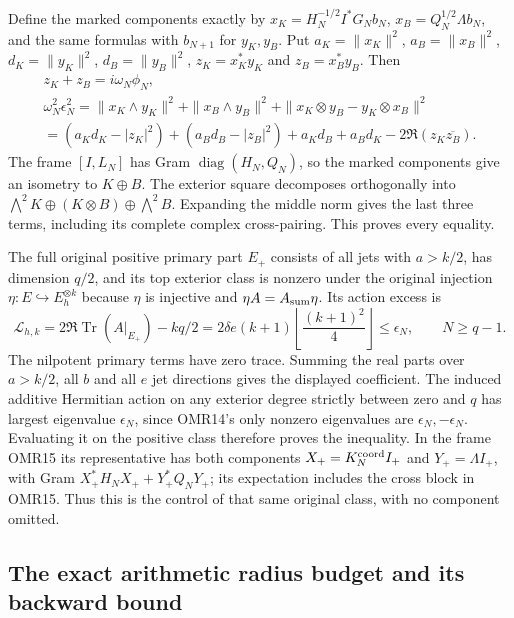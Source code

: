 \documentclass[11pt,a4paper]{article}
\begin{document}
Define the marked components exactly by
$x_K=H_N^{-1/2}I^*G_Nb_N$, $x_B=Q_N^{1/2}\Lambda b_N$,
and the same formulas with $b_{N+1}$ for $y_K,y_B$. Put
$a_K=\|x_K\|^2$, $a_B=\|x_B\|^2$,
$d_K=\|y_K\|^2$, $d_B=\|y_B\|^2$,
$z_K=x_K^*y_K$ and $z_B=x_B^*y_B$. Then
\[
 \begin{gathered}
 z_K+z_B=i\omega_N\phi_N,\\
 \omega_N^2\epsilon_N^2
 =\|x_K\wedge y_K\|^2+\|x_B\wedge y_B\|^2
          +\|x_K\otimes y_B-y_K\otimes x_B\|^2\\
 =(a_Kd_K-|z_K|^2)+(a_Bd_B-|z_B|^2)
       +a_Kd_B+a_Bd_K-2\Re(z_K\overline{z_B}).
 \end{gathered}\tag{OMR16}
\]
The frame $[I,L_N]$ has Gram $\operatorname{diag}(H_N,Q_N)$,
so the marked components give an isometry to $K\oplus B$.
The exterior square decomposes orthogonally into
$\bigwedge^2K\oplus(K\otimes B)\oplus\bigwedge^2B$.
Expanding the middle norm gives the last three terms, including
its complete complex cross-pairing. This proves every equality.

The full original positive primary part $E_+$ consists of all
jets with $a>k/2$, has dimension $q/2$, and its top exterior
class is nonzero under the original injection
$\eta:E\hookrightarrow E_h^{\otimes k}$ because $\eta$ is
injective and $\eta A=A_{\rm sum}\eta$. Its action excess is
\[
 \mathcal L_{h,k}=2\Re\operatorname{Tr}(A|_{E_+})-kq/2
     =2\delta e(k+1)\left\lfloor\frac{(k+1)^2}{4}\right\rfloor
     \le\epsilon_N,\qquad N\ge q-1.
 \tag{OMR17}
\]
The nilpotent primary terms have zero trace. Summing the real
parts over $a>k/2$, all $b$ and all $e$ jet directions gives the
displayed coefficient. The induced additive Hermitian action on
any exterior degree strictly between zero and $q$ has largest
eigenvalue $\epsilon_N$, since OMR14's only nonzero eigenvalues
are $\epsilon_N,-\epsilon_N$. Evaluating it on the positive
class therefore proves the inequality. In the frame OMR15 its
representative has both components
$X_+=K_N^{\rm coord}I_+$ and $Y_+=\Lambda I_+$, with Gram
$X_+^*H_NX_++Y_+^*Q_NY_+$; its expectation includes the cross
block in OMR15. Thus this is the control of that same original
class, with no component omitted.

\subsection{The exact arithmetic radius budget and its backward bound}
\end{document}
